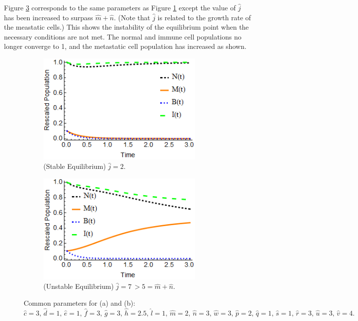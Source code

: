 \documentclass[letter,10pt]{article}
\begin{document}
%

Figure \ref{F2} corresponds to the same parameters as Figure \ref{F1} except the value of $\hat{j}$ has been increased to surpass $\hat{m}+ \hat{n}$. (Note that $\hat{j}$ is related to the growth rate of the meastatic cells.) This shows the instability of the equilibrium point when the necessary conditions are not met. The normal and immune cell populations no longer converge to 1, and the metastatic cell population has increased as shown. 

\begin{figure}
\centering
\begin{subfigure}{.49\textwidth}
  \centering
  \includegraphics[width=3.2in]{1a.png}
  \caption{(Stable Equilibrium)  $\hat{j}=2$.}
  \label{F1}
\end{subfigure}%
\begin{subfigure}{.49\textwidth}
  \centering
  \includegraphics[width=3.2in]{1b.png}
  \caption{(Unstable Equilibrium)  $\hat{j}=7\,>5=\hat{m}+\hat{n}$.}
  \label{F2}
\end{subfigure}
\caption{Common parameters for (a) and (b): $\hat{c}=3, \, \hat{d}=1,\,  \hat{e}=1,\,  \hat{f}=3, \, \hat{g}=3,\, \hat{h}=2.5,\, \hat{l}=1,\,  \hat{m}=2,\, \hat{n}=3,\, \hat{w}=3,\, \hat{p}=2, \,
\hat{q}=1,\, \hat{s}=1,\, \hat{r}=3,\, \hat{u}=3,\, \hat{v}=4.$}
\end{figure}
\end{document}
